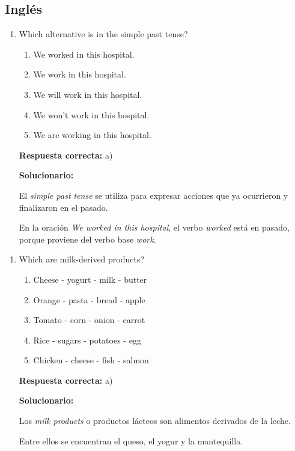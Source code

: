 \subsection*{Inglés}

\begin{enumerate}[resume]
	
	\item Which alternative is in the simple past tense?
	
	\begin{enumerate}[label=\alph*)]
		\item We worked in this hospital.
		\item We work in this hospital.
		\item We will work in this hospital.
		\item We won't work in this hospital.
		\item We are working in this hospital.
	\end{enumerate}
	
	\textbf{Respuesta correcta:} a)
	
	\vspace{2mm}
	\textbf{Solucionario:}
	
	El \textit{simple past tense} se utiliza para expresar acciones que ya ocurrieron y finalizaron en el pasado.
	
	En la oración \textit{We worked in this hospital}, el verbo \textit{worked} está en pasado, porque proviene del verbo base \textit{work}.
	
\end{enumerate}

\begin{enumerate}[resume]
	
	\item Which are milk-derived products?
	
	\begin{enumerate}[label=\alph*)]
		\item Cheese - yogurt - milk - butter
		\item Orange - pasta - bread - apple
		\item Tomato - corn - onion - carrot
		\item Rice - sugars - potatoes - egg
		\item Chicken - cheese - fish - salmon
	\end{enumerate}
	
	\textbf{Respuesta correcta:} a)
	
	\vspace{2mm}
	\textbf{Solucionario:}
	
	Los \textit{milk products} o productos lácteos son alimentos derivados de la leche.
	
	Entre ellos se encuentran el queso, el yogur y la mantequilla.
	
\end{enumerate}


